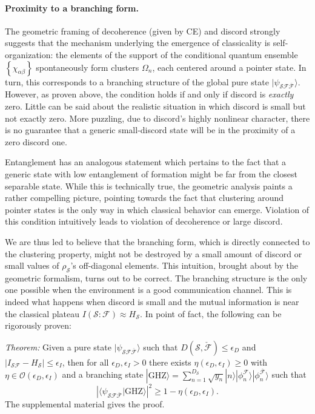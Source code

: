 \documentclass[a4paper,11pt,accepted=2024-09-14]{quantumarticle}
\newcommand{\ket}[1]    {| #1 \rangle}
\newcommand{\+}         {\dagger}
\newcommand{\mc}[1]{\mathcal{#1}}
\begin{document}
\paragraph{Proximity to a branching form.} The geometric framing of decoherence ({given by CE}) and discord strongly suggests that the mechanism underlying the emergence of classicality is self-organization: the elements of the support of the {conditional quantum ensemble} $\left\{ \chi_{\alpha \beta}\right\}$ spontaneously form clusters $\Omega_n$, each centered around a pointer state. In turn, this corresponds to a branching structure of the global pure state $\ket{\psi_{\mc{S}\mc{F} \overline{\mc{F}}}}$. However, as proven above, the condition holds if and only if discord is \emph{exactly} zero. Little can be said about the realistic situation in which discord is small but not exactly zero. More puzzling, due to discord's highly nonlinear character, there is no guarantee that a generic small-discord state will be in the proximity of a zero discord one. 

Entanglement has an analogous statement which pertains to the fact that a generic state with low entanglement of formation might be far from the closest separable state. While this is technically true, the geometric analysis paints a rather compelling picture, pointing towards the fact that clustering around pointer states is the only way in which classical behavior can emerge. Violation of this condition intuitively leads to violation of decoherence or large discord.

We are thus led to believe that the branching form, which is directly connected to the clustering property, might not be destroyed by a small amount of discord or small values of $\rho_{\mc{S}}$'s off-diagonal elements. This intuition, brought about by the geometric formalism, turns out to be correct. The branching structure is the only one possible when the environment is a good communication channel. This is indeed what happens when discord is small and the mutual information is near the classical plateau $I(\mc{S}:\mc{F}) \approx H_{\mc{S}}$. In point of fact, the following can be rigorously proven:

\textit{Theorem:} Given a pure state $\ket{\psi_{\mc{S}\mc{F}\overline{\mc{F}}}}$ such that $D(\mc{S},\check{\mc{F}})\leq \epsilon_D$ and $|I_{\mc{S}\mc{F}}-H_{\mc{S}}|\leq \epsilon_I$, then for all $\epsilon_D,\epsilon_I > 0$ there exists $\eta(\epsilon_D,\epsilon_I)\geq 0$ with $\eta \in \mathcal{O}(\epsilon_D,\epsilon_I)$ and a branching state $\ket{\mathrm{GHZ}}= \sum_{n=1}^{D_\mc{S}} \sqrt{y_n}\ket{n} \ket{\phi_n^{\mc{F}}}\ket{\phi_n^{\overline{\mc{F}}}}$ such that
\begin{equation}
    \left\vert \langle \psi_{\mc{S}\mc{F}\overline{\mc{F}}} \vert \mathrm{GHZ}\rangle  \right\vert^2 \geq 1-\eta(\epsilon_D,\epsilon_I)
    .
\label{mainth1}
\end{equation}
The supplemental material gives the proof.
\end{document}
